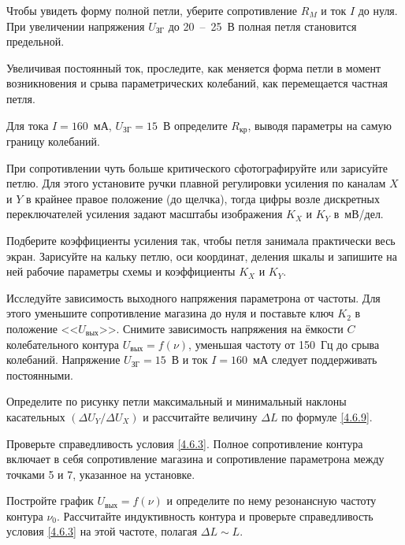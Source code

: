 \begin{lab:task}
Чтобы увидеть форму полной петли, уберите сопротивление $R_M$ и ток $I$ до нуля.
При увеличении напряжения $U_\text{ЗГ}$ до 20~--~25~В полная петля становится
предельной.

\item
Увеличивая постоянный ток, проследите, как меняется форма петли в момент
возникновения и срыва параметрических колебаний, как перемещается частная петля.

\item
Для тока $I = 160$~мА, $U_\text{ЗГ} = 15$~В определите $R_\text{кр}$, выводя
параметры на самую границу колебаний.

\item
При сопротивлении чуть больше критического сфотографируйте или зарисуйте петлю.
Для этого установите
ручки плавной регулировки усиления по каналам $X$ и $Y$ в крайнее правое
положение (до щелчка), тогда цифры возле дискретных переключателей усиления
задают масштабы изображения $K_X$ и $K_Y$ в~мВ/дел.

Подберите коэффициенты усиления так, чтобы петля занимала практически весь
экран. Зарисуйте на кальку петлю, оси координат, деления шкалы и запишите на ней
рабочие параметры схемы и коэффициенты $K_X$ и $K_Y$.

\item Исследуйте зависимость выходного напряжения параметрона от частоты. Для
этого уменьшите сопротивление магазина до нуля и поставьте ключ $K_2$ в
положение <<$U_\text{вых}$>>. Снимите зависимость напряжения на ёмкости $C$
колебательного контура $U_\text{вых} = f(\nu)$, уменьшая частоту от 150~Гц до
срыва колебаний. Напряжение $U_\text{ЗГ} = 15$~В и ток $I = 160$~мА следует
поддерживать постоянными.


\item
Определите по рисунку петли максимальный и минимальный наклоны касательных
$(\Delta U_Y/ \Delta U_X)$ и рассчитайте величину $\Delta L$ по формуле
\eqref{4.6.9}.

Проверьте справедливость условия \eqref{4.6.3}. Полное сопротивление контура
включает в себя сопротивление магазина и сопротивление параметрона между точками
5 и 7, указанное на установке.

\item
Постройте график $U_\text{вых} = f(\nu)$ и определите по нему резонансную
частоту контура $\nu_0$. Рассчитайте индуктивность контура
и проверьте справедливость условия \eqref{4.6.3} на
этой частоте, полагая $\Delta L \sim L$.

\end{lab:task}


